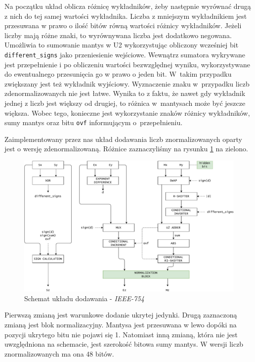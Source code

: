 \documentclass{article}
\begin{document}
Na początku układ oblicza różnicę wykładników, żeby następnie wyrównać drugą z nich do tej samej wartości wykładnika.
Liczba z mniejszym wykładnikiem jest przesuwana w prawo o ilość bitów równą wartości różnicy wykładników.
Jeżeli liczby mają różne znaki, to wyrównywana liczba jest dodatkowo negowana.
Umożliwia to sumowanie mantys w U2 wykorzystując obliczony wcześniej bit \texttt{different\_signs} jako przeniesienie wejściowe.
Wewnątrz sumatora wykrywane jest przepełnienie i po obliczeniu wartości bezwzględnej wyniku, wykorzystywane do ewentualnego przesunięcia go w prawo o jeden bit.
W~takim przypadku zwiększany jest też wykładnik wyjściowy.
Wyznaczenie znaku w~przypadku liczb zdenormalizowanych nie jest łatwe.
Wynika to z faktu, że nawet gdy wykładnik jednej z liczb jest większy od drugiej, to różnica w~mantysach może być jeszcze większa.
Wobec tego, konieczne jest wykorzystanie znaków różnicy wykładników, sumy mantys oraz bitu \texttt{ovf} informującym o~przepełnieniu.

Zaimplementowany przez nas układ dodawania liczb znormalizowanych oparty jest o wersję zdenormalizowaną.
Różnice zaznaczyliśmy na rysunku \ref{fig:diagram_add_ieee754} na zielono.

\begin{figure}[H]
	\centering
	\includegraphics[width=\textwidth]{figures/diagram_add_ieee754.pdf}
	\caption{Schemat układu dodawania - \emph{IEEE-754}}
	\label{fig:diagram_add_ieee754}
\end{figure}

Pierwszą zmianą jest warunkowe dodanie ukrytej jedynki.
Drugą zaznaczoną zmianą jest blok normalizacyjny.
Mantysa jest przesuwana w lewo dopóki na pozycji ukrytego bitu nie pojawi się 1.
Natomiast inną zmianą, która nie jest uwzględniona na schemacie, jest szerokość bitowa sumy mantys.
W wersji liczb znormalizowanych ma ona 48 bitów.
\end{document}
